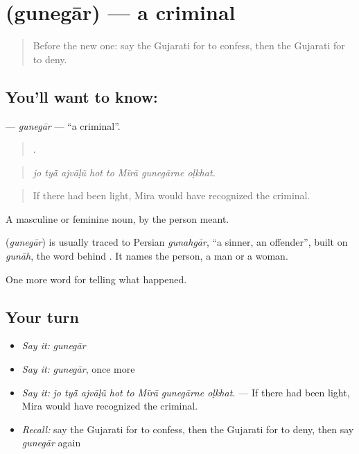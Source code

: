 \section[\texorpdfstring{\gu{ગુનેગાર} (gunegār)}{ગુનેગાર (gunegār)}]{ (gunegār) — a criminal}

\label{lesson:GU-C288-gunegar}



\begin{quote}
Before the new one: say the Gujarati for to confess, then the Gujarati for to deny.
\end{quote}

\subsection*{You'll want to know: }
\textbf{} — \emph{gunegār} — \textquotedblleft{}a criminal\textquotedblright{}.

\begin{quote}
       .
\end{quote}

\begin{quote}
\emph{jo tyā̃ ajvāḷũ hot to Mīrā gunegārne oḷkhat.}
\end{quote}

\begin{quote}
If there had been light, Mira would have recognized the criminal.
\end{quote}

A masculine or feminine noun, by the person meant.

\begin{cousinweb}
\textbf{} (\emph{gunegār}) is usually traced to Persian \emph{gunahgār}, \textquotedblleft{}a sinner, an offender\textquotedblright{}, built on \emph{gunāh}, the word behind \textbf{}. It names the person, a man or a woman.
\end{cousinweb}

\begin{grammarlens}[title={What you've built}]
One more word for telling what happened.
\end{grammarlens}

\subsection*{Your turn}
\begin{itemize}
\raggedright
  \item \emph{Say it:} \emph{gunegār}
  \item \emph{Say it:} \emph{gunegār}, once more
  \item \emph{Say it:} \emph{jo tyā̃ ajvāḷũ hot to Mīrā gunegārne oḷkhat.} — If there had been light, Mira would have recognized the criminal.
  \item \emph{Recall:} say the Gujarati for to confess, then the Gujarati for to deny, then say \emph{gunegār} again
\end{itemize}

